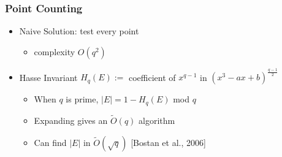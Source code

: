 \documentclass{beamer}
\newcommand{\ot}{\widetilde{O}}
\begin{document}





\begin{frame}
\frametitle{Point Counting}

\begin{itemize}
\item Naive Solution: test every point
\begin{itemize}
    \item complexity $O(q^2)$
\end{itemize}

\item Hasse Invariant $H_{q}(E) :=$ coefficient of $x^{q - 1}$ in $(x^3 - ax + b)^{\frac{q-1}{2}}$
\begin{itemize}
    \item When $q$ is prime, $|E| = 1 - H_{q}(E)$ mod $q$
    \item Expanding gives an $\ot(q)$ algorithm
    \item Can find $|E|$ in $\ot(\sqrt{q})$ [Bostan et al., 2006]
\end{itemize}

\end{itemize}


\end{frame}

\end{document}
